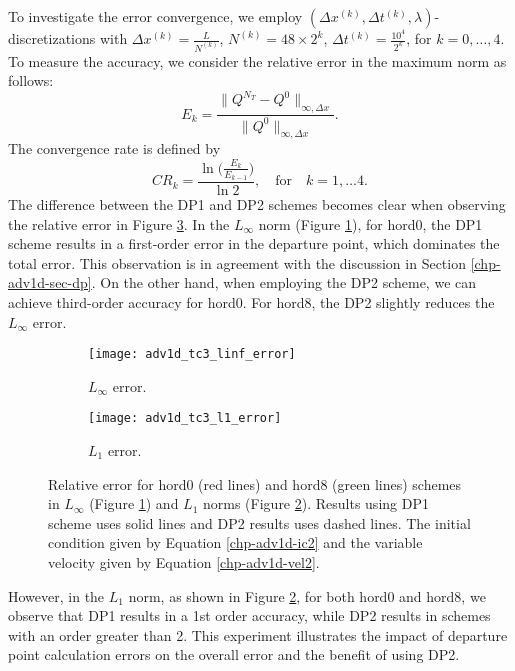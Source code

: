 To investigate the error convergence, we employ $(\Delta x^{(k)}, \Delta t^{(k)}, \lambda)$-discretizations with $\Delta x^{(k)} = \frac{L}{N^{(k)}}$,
$N^{(k)} = 48 \times 2^k$,
$\Delta t^{(k)}=\frac{10^4}{{2^{k}}}$, for $k = 0, \ldots, 4$.
To measure the accuracy, we consider the relative error in the maximum norm as follows:
\begin{equation*}
	E_k = 
	\frac{\| Q^{N_T} - Q^0 \|_{\infty, \Delta x}}{\|Q^0\|_{\infty, \Delta x}}.
\end{equation*}
The convergence rate is defined by
\begin{equation*}
	CR_k = \frac{\ln{\bigg(\frac{E_{k}}{E_{k-1}}}\bigg)}{\ln 2}, \quad \text{for} \quad k = 1, \ldots 4.
\end{equation*}
The difference between the DP1 and DP2 schemes becomes clear when observing the relative error in Figure \ref{chp-adv1d-sec-exp-adv2-2}.
In the $L_{\infty}$ norm (Figure \ref{chp-adv1d-sec-exp-adv2-error-linf}), 
for hord0, the DP1 scheme results in a first-order error in the departure point, which dominates the total error.
This observation is in agreement with the discussion in Section \ref{chp-adv1d-sec-dp}.
On the other hand, when employing the DP2 scheme, we can achieve third-order accuracy for hord0.
For hord8, the DP2 slightly reduces the $L_{\infty}$ error.
\begin{figure}[!htb]
	\centering
	\begin{subfigure}{0.45\textwidth}
		\centering
		\texttt{[image: adv1d\_tc3\_linf\_error]}
		\caption{$L_{\infty}$ error.\label{chp-adv1d-sec-exp-adv2-error-linf}}
	\end{subfigure}
	\begin{subfigure}{0.45\textwidth}
		\centering
		\texttt{[image: adv1d\_tc3\_l1\_error]}
		\caption{$L_1$ error.\label{chp-adv1d-sec-exp-adv2-error-l1}}
	\end{subfigure}
	\caption{Relative error for hord0 (red lines) and hord8 (green lines) schemes
	         in $L_{\infty}$
	         (Figure \ref{chp-adv1d-sec-exp-adv2-error-linf})
	         and $L_1$ norms
                 (Figure \ref{chp-adv1d-sec-exp-adv2-error-l1}).
	        Results using DP1 scheme uses solid lines and DP2 results uses dashed lines.
		The initial condition given by Equation
		\eqref{chp-adv1d-ic2} and the variable 
		velocity given by Equation \eqref{chp-adv1d-vel2}.\label{chp-adv1d-sec-exp-adv2-2}}
\end{figure}

However, in the $L_1$ norm, as shown in Figure \ref{chp-adv1d-sec-exp-adv2-error-l1}, 
for both hord0 and hord8, we observe that DP1 results in a 1st order accuracy, 
while DP2 results in schemes with an order greater than 2.
This experiment illustrates the impact of departure point calculation errors on the overall error and the benefit of using DP2.

